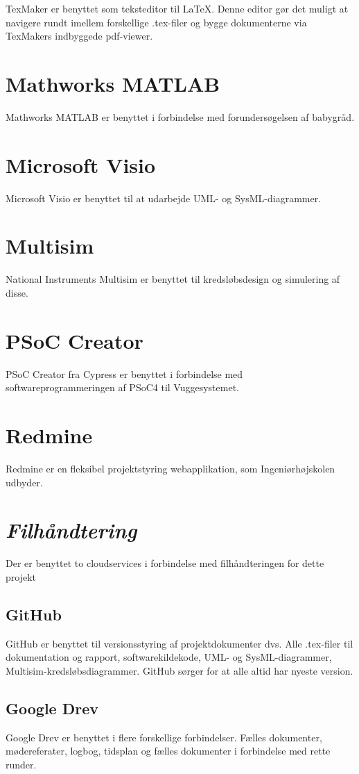 TexMaker er benyttet som teksteditor til \LaTeX. Denne editor gør det muligt at navigere rundt imellem forskellige .tex-filer og bygge dokumenterne via TexMakers indbyggede pdf-viewer.

\section*{Mathworks MATLAB}
Mathworks MATLAB er benyttet i forbindelse med forundersøgelsen af babygråd. 

\section*{Microsoft Visio}
Microsoft Visio er benyttet til at udarbejde UML- og SysML-diagrammer. 

\section*{Multisim}
National Instruments Multisim er benyttet til kredsløbsdesign og simulering af disse. 

\section*{PSoC Creator}
PSoC Creator fra Cypress er benyttet i forbindelse med softwareprogrammeringen af PSoC4 til Vuggesystemet. 

\section*{Redmine}
Redmine er en fleksibel projektstyring webapplikation, som Ingeniørhøjskolen udbyder.

\section*{\textit{Filhåndtering}}
Der er benyttet to cloudservices i forbindelse med filhåndteringen for dette projekt

\subsection*{GitHub}
GitHub er benyttet til versionsstyring af projektdokumenter dvs. Alle .tex-filer til dokumentation og rapport, softwarekildekode, UML- og SysML-diagrammer, Multisim-kredsløbsdiagrammer. GitHub sørger for at alle altid har nyeste version. 

\subsection*{Google Drev}
Google Drev er benyttet i flere forskellige forbindelser. Fælles dokumenter, mødereferater, logbog, tidsplan og fælles dokumenter i forbindelse med rette runder.